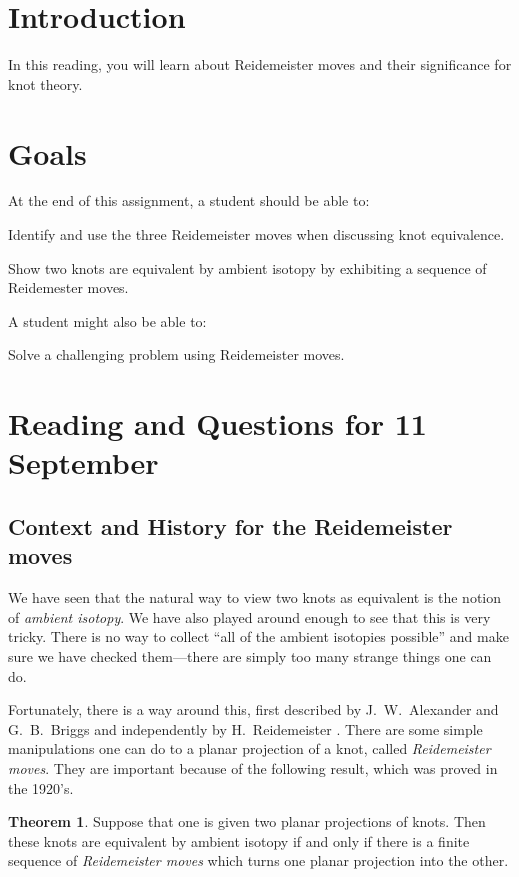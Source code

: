 \documentclass[12pt,letterpaper]{article}
\theoremstyle{definition}
\newtheorem*{theorem}{Theorem}
\begin{document}
\setlength{\parskip}{1ex plus 0.5ex minus 0.2ex}
\setlength{\parindent}{0pt}

\pagestyle{fancy}
\cfoot{}

\section*{Introduction}
In this reading, you will learn about Reidemeister moves and their significance for knot theory.

\section*{Goals}
At the end of this assignment, a student should be able to:
\begin{compactitem}
\item Identify and use the three Reidemeister moves when discussing knot equivalence.
\item Show two knots are equivalent by ambient isotopy by exhibiting a sequence of Reidemester moves.
\end{compactitem}
A student might also be able to:
\begin{compactitem}
\item Solve a challenging problem using Reidemeister moves.
\end{compactitem}

\section*{Reading and Questions for 11 September}

\subsection*{Context and History for the Reidemeister moves}
We have seen that the natural way to view two knots as equivalent is the notion of \emph{ambient isotopy}. 
We have also played around enough to see that this is very tricky. 
There is no way to collect ``all of the ambient isotopies possible'' and make sure we have checked them---there are simply too many strange things one can do.

Fortunately, there is a way around this, first described by J.~W.~Alexander and G.~B.~Briggs \cite{AB} and independently by H.~Reidemeister \cite{R}. 
There are some simple manipulations one can do to a planar projection of a knot, called \emph{Reidemeister moves}. 
They are important because of the following result, which was proved in the 1920's.
\begin{theorem}
Suppose that one is given two planar projections of knots. 
Then these knots are equivalent by ambient isotopy if and only if there is a finite sequence of \emph{Reidemeister moves} which turns one planar projection into the other.
\end{theorem}
\end{document}
